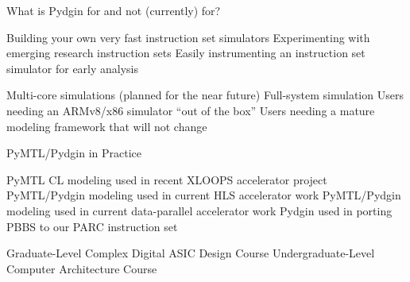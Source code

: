 \begin{frame}{What is Pydgin for and not (currently) for?}
\begin{cbxlist}

  \1 

     \2 Building your own very fast instruction set simulators
     \2 Experimenting with emerging research instruction sets
     \2 Easily instrumenting an instruction set simulator for early analysis

  \1 

     \2 Multi-core simulations (planned for the near future)
     \2 Full-system simulation
     \2 Users needing  an ARMv8/x86 simulator ``out of the box''
     \2 Users needing a mature modeling framework that will not change

\end{cbxlist}
\end{frame}

\begin{frame}{PyMTL/Pydgin in Practice}
\begin{cbxlist}

  \1 
     \2 PyMTL CL modeling used in recent XLOOPS accelerator project
     \2 PyMTL/Pydgin modeling used in current HLS accelerator work
     \2 PyMTL/Pydgin modeling used in current data-parallel accelerator work
     \2 Pydgin used in porting PBBS to our PARC instruction set

  \1 
     \2 Graduate-Level Complex Digital ASIC Design Course
     \2 Undergraduate-Level Computer Architecture Course

\end{cbxlist}
\end{frame}

